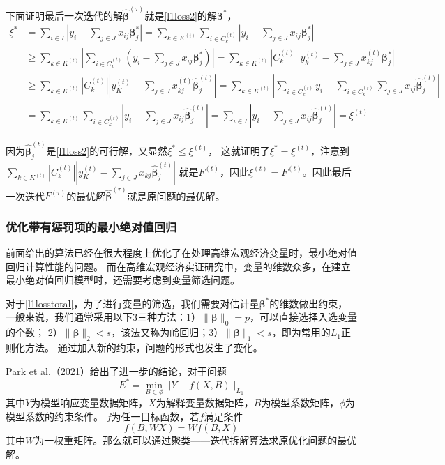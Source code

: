 下面证明最后一次迭代的解$\hat{\bm{\beta}}^{(\tau)}$就是\eqref{l1loss2}的解$\bm{\beta}^*$，
\begin{equation*}
    \begin{split}
        \xi^* & = \sum_{i \in I} |y_i - \sum_{j \in J}x_{ij}\bm{\beta}_j^*|
        = \sum_{k \in K^{(t)}}\sum_{i \in C_k^{(t)}}|y_i - \sum_{j \in J}x_{ij}\bm{\beta}_j^*| \\
        & \geq \sum_{k \in K^{(t)}}|\sum_{i\in C_k^{(t)}}(y_i - \sum_{j \in J}x_{ij}\bm{\beta}_j^*)|
        = \sum_{k \in K^{(t)}}|C_k^{(t)}||y_k^{(t)} - \sum_{j \in J}x_{kj}^{(t)}\bm{\beta}_j^*|\\
        & \geq \sum_{k \in K^{(t)}} |C_k^{(t)}||y_K^{(t)} - \sum_{j\in J}x_{kj}^{(t)} \hat{\bm{\beta}}_j^{(t)}|
        = \sum_{k \in K^{(t)}} |\sum_{i \in C_k^{(t)}} y_i - \sum_{i \in C_k^{(t)}}\sum_{j \in J}x_{ij}\hat{\bm{\beta}}_j^{(t)}| \\
        & = \sum_{k \in K^{(t)}} \sum_{i \in C_k^{(t)}}|y_i - \sum_{j \in J}x_{ij}\hat{\bm{\beta}}_j^{(t)}|
        = \sum_{i \in I}|y_i - \sum_{j \in J} x_{ij} \hat{\bm{\beta}}_j^{(t)}| 
        = \xi^{(t)}
    \end{split}
\end{equation*}

因为$\hat{\bm{\beta}}_j^{(t)}$是\eqref{l1loss2}的可行解，又显然$\xi^* \leq \xi^{(t)}$，
这就证明了$\xi^* = \xi^{(t)}$，注意到$ \sum_{k \in K^{(t)}} |C_k^{(t)}||y_K^{(t)} - \sum_{j\in J}x_{kj} \hat{\bm{\beta}}_j^{(t)}|$
就是$F^{(t)}$，因此$\xi^{(t)} = F^{(t)}$。因此最后一次迭代$F^{(\tau)}$的最优解$\hat{\bm{\beta}}^{(\tau)}$就是原问题的最优解。

\subsubsection{优化带有惩罚项的最小绝对值回归}
前面给出的算法已经在很大程度上优化了在处理高维宏观经济变量时，最小绝对值回归计算性能的问题。
而在高维宏观经济实证研究中，变量的维数众多，在建立最小绝对值回归模型时，还需要考虑到变量筛选问题。

对于\eqref{l1losstotal}，为了进行变量的筛选，我们需要对估计量$\bm{\beta}^*$的维数做出约束，
一般来说，我们通常采用以下3三种方法：1）$\|\bm{\beta}\|_0 = p$，可以直接选择入选变量的个数；
2）$\|\bm{\beta}\|_2 < s$，该法又称为岭回归；3）$\|\bm{\beta}\|_1 < s$，即为常用的$L_1$正则化方法。
通过加入新的约束，问题的形式也发生了变化。

Park et al.（2021）给出了进一步的结论\cite{park2021optimization}，对于问题
\begin{equation}\label{l1conclusion}
    E^* = \underset{B\in \phi}{\operatorname{min}} ||Y - f(X, B)||_{L_1}
\end{equation}
其中$Y$为模型响应变量数据矩阵，$X$为解释变量数据矩阵，$B$为模型系数矩阵，$\phi$为模型系数的约束条件。
$f$为任一目标函数，若$f$满足条件
\begin{equation}\label{fcondition}
    f(B, WX) = Wf(B, X)
\end{equation}
其中$W$为一权重矩阵。那么就可以通过聚类——迭代拆解算法求原优化问题的最优解。

